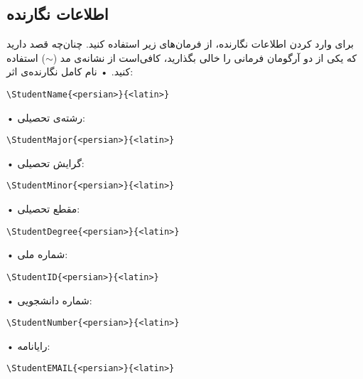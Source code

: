 \documentclass[%
12pt,%
twoside, %
openany, %
notitlepage,%
fleqn,%
]{article}
\numberwithin{equation}{section} %
\begin{document}
\subsection{اطلاعات نگارنده}
برای وارد کردن اطلاعات نگارنده، از فرمان‌های زیر استفاده کنید\@. چنان‌چه قصد دارید که یکی از دو آرگومان فرمانی را خالی بگذارید، کافی‌است از نشانه‌ی مد ($\sim$) استفاده کنید\@. 
• نام کامل نگارنده‌ی اثر:
\begin{latin}\begin{verbatim}
\StudentName{<persian>}{<latin>}
\end{verbatim} \end{latin}
• رشته‌ی تحصیلی:
\begin{latin}\begin{verbatim}
\StudentMajor{<persian>}{<latin>}
\end{verbatim} \end{latin}
• گرایش تحصیلی:
\begin{latin}\begin{verbatim}
\StudentMinor{<persian>}{<latin>}
\end{verbatim} \end{latin}
• مقطع تحصیلی:
\begin{latin}\begin{verbatim}
\StudentDegree{<persian>}{<latin>}
\end{verbatim} \end{latin}
• شماره ملی:
\begin{latin}\begin{verbatim}
\StudentID{<persian>}{<latin>}
\end{verbatim} \end{latin}
• شماره دانشجویی:
\begin{latin}\begin{verbatim}
\StudentNumber{<persian>}{<latin>}
\end{verbatim} \end{latin}
• رایانامه:
\begin{latin}\begin{verbatim}
\StudentEMAIL{<persian>}{<latin>}
\end{verbatim} \end{latin}
\end{document}
